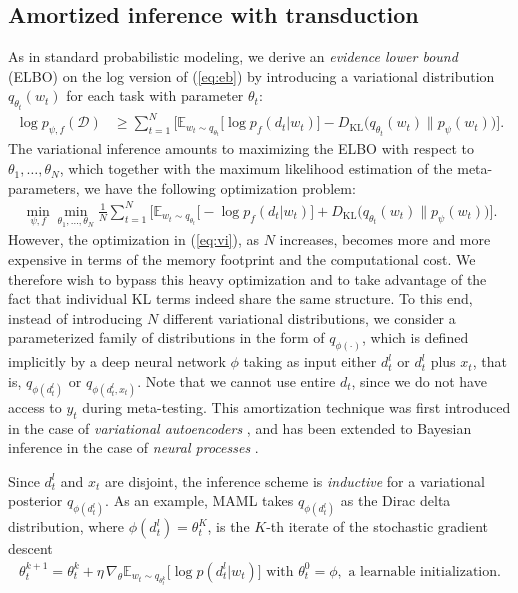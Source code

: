 \documentclass{article} \usepackage{iclr2020_conference,times}
\def\eqref#1{(\ref{#1})}
\def\gD{{\mathcal{D}}}
\newcommand{\E}{\mathbb{E}}
\newcommand{\supp}{l}
\begin{document}
\subsection{Amortized inference with transduction}
\label{sec:avi}

As in standard probabilistic modeling, 
we derive an \emph{evidence lower bound} (ELBO) on the log version of \eqref{eq:eb}
by introducing a variational distribution $q_{\theta_t}(w_t)$ for each task with parameter $\theta_t$: 
\begin{align}
    \label{eq:vae}
    \log p_{\psi, f}(\gD) &\geq \sum_{t=1}^N \Big[ \E_{w_t \sim q_{\theta_t}} \big[ \log p_f(d_t | w_t) \big] - D_\text{KL}\big(q_{\theta_t}(w_t) \| p_\psi(w_t) \big) \Big].
\end{align}
The variational inference amounts to maximizing the ELBO with respect to $\theta_1, \ldots, \theta_N$, which 
together with the maximum likelihood estimation of the meta-parameters, we have the following optimization problem:
\begin{align}
    \label{eq:vi}
\min_{\psi,f} \min_{\theta_1, \ldots, \theta_N} \frac{1}{N} \sum_{t=1}^N \Big[ \E_{w_t \sim q_{\theta_t}} \big[ -\log p_f(d_t | w_t) \big] + D_\text{KL}\big(q_{\theta_t}(w_t) \| p_\psi(w_t) \big) \Big]. 
\end{align}
However, the optimization in \eqref{eq:vi}, as $N$ increases, becomes more and more expensive in terms of the memory footprint and the computational cost.
We therefore wish to bypass this heavy optimization
and to take advantage of the fact that
individual KL terms indeed share the same structure.
To this end, instead of introducing $N$ different variational distributions, 
we consider a parameterized family of distributions in the form of $q_{\phi(\cdot)}$, 
which is defined implicitly by a deep neural network $\phi$ taking as input either $d_t^l$ or $d_t^l$ plus $x_t$,
that is, $q_{\phi(d_t^l)}$ or $q_{\phi(d_t^l, x_t)}$.
Note that we cannot use entire $d_t$,
since we do not have access to $y_t$ during meta-testing.
This amortization technique was first introduced in the case of \emph{variational autoencoders} \citep{kingma2013auto,rezende2014stochastic},
and has been extended to Bayesian inference in the case of \emph{neural processes} \citep{garnelo2018neural}.

Since $d_t^\supp$ and $x_t$ are disjoint, the inference scheme is \emph{inductive} for a variational posterior $q_{\phi(d_t^\supp)}$.
As an example, MAML \citep{finn2017model} takes $q_{\phi(d_t^\supp)}$ as the Dirac delta distribution,
where $\phi(d_t^\supp) = \theta_t^K$, is the $K$-th iterate of the stochastic gradient descent
\begin{align}
    \label{eq:maml}
    \theta_t^{k+1} = \theta_t^k + \eta \, \nabla_{\theta} \E_{w_t \sim q_{\theta_t^k}}\Big[ \log p(d_t^\supp | w_t) \Big] \,\,\text{with}\,\,\theta_t^0 = \phi, \,\,\text{a learnable initialization}.
\end{align}
\end{document}
